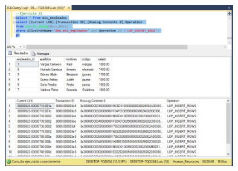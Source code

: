 \begin{enumerate}[1.]
	\begin{center}
	\includegraphics[width=10cm]{./Imagenes/1ejer22} 
	\end{center}

\end{enumerate} 
